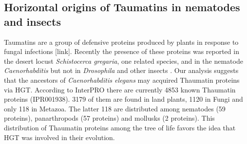\subsection{Horizontal origins of Taumatins in nematodes and insects}
Taumatins are a group of defensive proteins produced by plants in response to
fungal infections [link]. Recently the presence of these proteins was reported
in the desert locust \textit{Schistocerca gregaria}, one related species, and
in the nematode \textit{Caenorhabditis} but not in \textit{Drosophila} and
other insects \cite{Brandazza2004}. Our analysis suggests that the ancestors of
\textit{Caenorhabditis elegans} may acquired Thaumatin proteins via HGT.
According to InterPRO \cite{Finn2017} there are currently 4853 known Thaumatin
proteins (IPR001938). 3179 of them are found in land plants, 1120 in Fungi and
only 118 in Metazoa. The latter 118 are distributed among nematodes (59
proteins), panarthropods (57 proteins) and mollusks (2 proteins). This
distribution of Thaumatin proteins among the tree of life favors the idea that
HGT was involved in their evolution.
